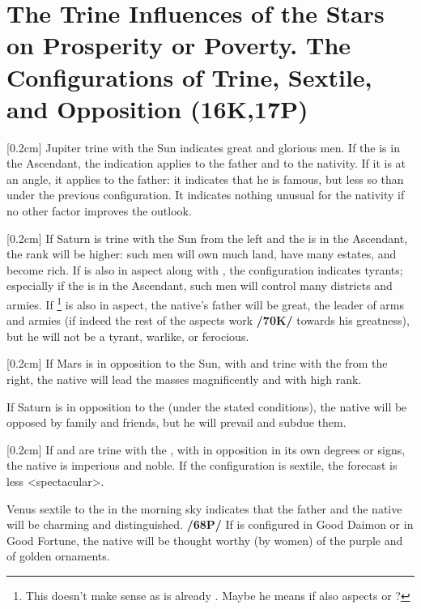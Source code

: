 \section{The Trine Influences of the Stars on Prosperity or Poverty. The Configurations of Trine, Sextile, and Opposition (16K,17P)}
\marginnote{\Jupiter \Trine \Sun}[0.2cm]
Jupiter trine with the Sun indicates great and glorious men. If the \Sun\xspace is in the Ascendant, the
indication applies to the father and to the nativity. If it is at an angle, it applies to the father: it indicates that he is famous, but less so than under the previous configuration. It indicates nothing unusual for the nativity if no other factor improves the outlook. 

\marginnote{\Saturn \Trine \Sun}[0.2cm]
If Saturn is trine with the Sun from the left and the \Sun\xspace is in the Ascendant, the rank will be higher: such men will own much land, have many estates, and become rich. If \Mars\xspace is also in aspect along with \Jupiter, the configuration indicates tyrants; especially if the \Sun\xspace is in the Ascendant, such men will control many districts and armies. If \Saturn\xspace \footnote{This doesn't make sense as \Saturn\xspace is already \Trine\Sun. Maybe he means if \Saturn\xspace also aspects \Mars\xspace or \Jupiter?}
is also in aspect, the native’s father will be great, the leader of arms and armies (if indeed the rest of the aspects work \textbf{/70K/} towards his greatness), but he will not be a tyrant, warlike, or ferocious. 

\marginnote{\Mars \Opposition \Sun}[0.2cm]
If Mars is in opposition to the Sun, with \Jupiter\xspace and \Saturn\xspace trine with the \Sun\xspace from the right, the native will lead the masses magnificently and with high rank. 

If Saturn is in opposition to the \Sun\xspace (under the stated conditions), the native will be opposed by family and friends, but he will prevail and subdue
them. 

\marginnote{\Saturn\xspace \Mars \Trine \Sun}[0.2cm]
If \Saturn\xspace and \Mars\xspace are trine with the \Sun, with \Jupiter\xspace in opposition in its own degrees or signs, the native is imperious and noble. If the configuration is sextile, the forecast is less <spectacular>.

Venus \marginnote{\Venus \Sextile \Sun} sextile to the \Sun\xspace in the morning sky indicates that the father and the native will be charming and distinguished. \textbf{/68P/} If \Venus\xspace is configured in Good Daimon or in Good Fortune, the native will be thought worthy (by women) of the purple and of golden ornaments.

